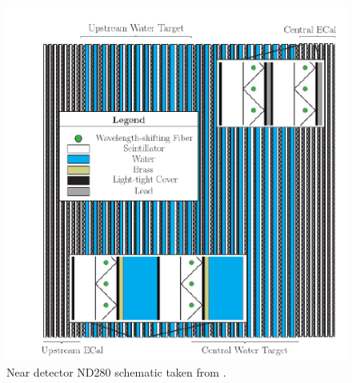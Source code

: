 \begin{figure}
    \includegraphics[width=\textwidth]{Figures/p0d.png}
    \caption{Near detector ND280 schematic taken from \cite{t2kcollaborationT2KExperiment2011}.}
\label{fig:p0d}
\end{figure}





